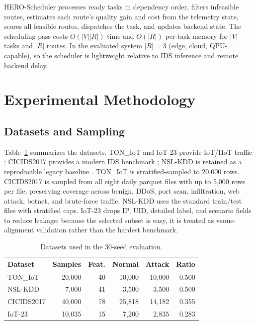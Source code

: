 \documentclass[conference]{IEEEtran}
\begin{document}
HERO-Scheduler processes ready tasks in dependency order, filters infeasible routes, estimates each route's quality gain and cost from the telemetry state, scores all feasible routes, dispatches the task, and updates backend state. The scheduling pass costs $O(|V||R|)$ time and $O(|R|)$ per-task memory for $|V|$ tasks and $|R|$ routes. In the evaluated system $|R|=3$ (edge, cloud, QPU-capable), so the scheduler is lightweight relative to IDS inference and remote backend delay.


\section{Experimental Methodology}
\subsection{Datasets and Sampling}
Table~\ref{tab:datasets} summarizes the datasets. TON\_IoT and IoT-23 provide IoT/IIoT traffic \cite{alsaedi2020toniot,garcia2020iot23}; CICIDS2017 provides a modern IDS benchmark \cite{sharafaldin2018toward,sharafaldin2018detailed}; NSL-KDD is retained as a reproducible legacy baseline \cite{tavallaee2009kdd}. TON\_IoT is stratified-sampled to 20,000 rows. CICIDS2017 is sampled from all eight daily parquet files with up to 5,000 rows per file, preserving coverage across benign, DDoS, port scan, infiltration, web attack, botnet, and brute-force traffic. NSL-KDD uses the standard train/test files with stratified caps. IoT-23 drops IP, UID, detailed label, and scenario fields to reduce leakage; because the selected subset is easy, it is treated as venue-alignment validation rather than the hardest benchmark.

\begin{table}[t]
\caption{Datasets used in the 30-seed evaluation.}
\label{tab:datasets}
\centering
\scriptsize
\begin{tabular}{lrrrrr}
\toprule
Dataset & Samples & Feat. & Normal & Attack & Ratio \\
\midrule
TON\_IoT & 20,000 & 40 & 10,000 & 10,000 & 0.500 \\
NSL-KDD & 7,000 & 41 & 3,500 & 3,500 & 0.500 \\
CICIDS2017 & 40,000 & 78 & 25,818 & 14,182 & 0.355 \\
IoT-23 & 10,035 & 15 & 7,200 & 2,835 & 0.283 \\
\bottomrule
\end{tabular}
\end{table}
\end{document}
